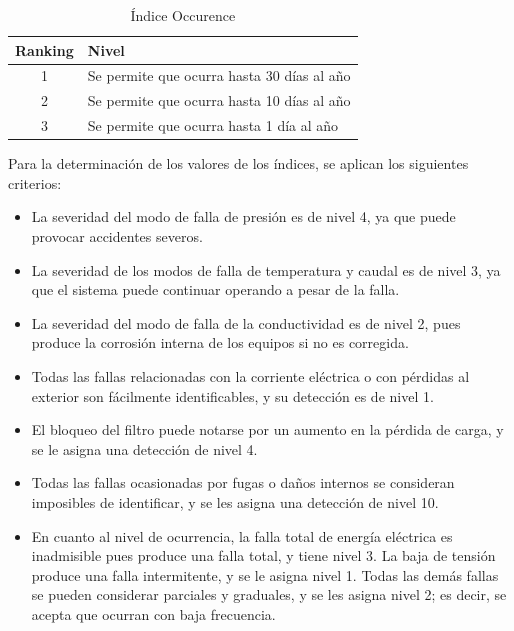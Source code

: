 \documentclass{article}
\begin{document}
\begin{table}[H]
\centering
\begin{tabularx}{\textwidth}{cX}
\toprule
Ranking & Nivel \\
\midrule
1 & Se permite que ocurra hasta 30 días al año \\
2 & Se permite que ocurra hasta 10 días al año \\
3 & Se permite que ocurra hasta 1 día al año \\
\bottomrule
\end{tabularx}
\caption{Índice Occurence}
\end{table}
Para la determinación de los valores de los índices, se aplican los siguientes criterios:
\begin{itemize}
    \item La severidad del modo de falla de presión es de nivel 4, ya que puede provocar accidentes severos.
    \item La severidad de los modos de falla de temperatura y caudal es de nivel 3, ya que el sistema puede continuar operando a pesar de la falla.
    \item La severidad del modo de falla de la conductividad es de nivel 2, pues produce la corrosión interna de los equipos si no es corregida.
    \item Todas las fallas relacionadas con la corriente eléctrica o con pérdidas al exterior son fácilmente identificables, y su detección es de nivel 1.
    \item El bloqueo del filtro puede notarse por un aumento en la pérdida de carga, y se le asigna una detección de nivel 4.
    \item Todas las fallas ocasionadas por fugas o daños internos se consideran imposibles de identificar, y se les asigna una detección de nivel 10.
    \item En cuanto al nivel de ocurrencia, la falla total de energía eléctrica es inadmisible pues produce una falla total, y tiene nivel 3. La baja de tensión produce una falla intermitente, y se le asigna nivel 1. Todas las demás fallas se pueden considerar parciales y graduales, y se les asigna nivel 2; es decir, se acepta que ocurran con baja frecuencia.
\end{itemize}
\end{document}
